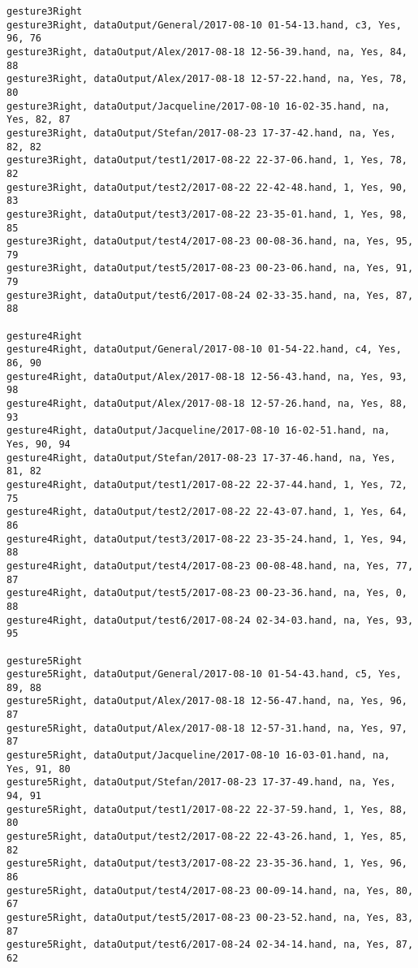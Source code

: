 \begin{verbatim}
gesture3Right
gesture3Right, dataOutput/General/2017-08-10 01-54-13.hand, c3, Yes, 96, 76
gesture3Right, dataOutput/Alex/2017-08-18 12-56-39.hand, na, Yes, 84, 88
gesture3Right, dataOutput/Alex/2017-08-18 12-57-22.hand, na, Yes, 78, 80
gesture3Right, dataOutput/Jacqueline/2017-08-10 16-02-35.hand, na, Yes, 82, 87
gesture3Right, dataOutput/Stefan/2017-08-23 17-37-42.hand, na, Yes, 82, 82
gesture3Right, dataOutput/test1/2017-08-22 22-37-06.hand, 1, Yes, 78, 82
gesture3Right, dataOutput/test2/2017-08-22 22-42-48.hand, 1, Yes, 90, 83
gesture3Right, dataOutput/test3/2017-08-22 23-35-01.hand, 1, Yes, 98, 85
gesture3Right, dataOutput/test4/2017-08-23 00-08-36.hand, na, Yes, 95, 79
gesture3Right, dataOutput/test5/2017-08-23 00-23-06.hand, na, Yes, 91, 79
gesture3Right, dataOutput/test6/2017-08-24 02-33-35.hand, na, Yes, 87, 88

gesture4Right
gesture4Right, dataOutput/General/2017-08-10 01-54-22.hand, c4, Yes, 86, 90
gesture4Right, dataOutput/Alex/2017-08-18 12-56-43.hand, na, Yes, 93, 98
gesture4Right, dataOutput/Alex/2017-08-18 12-57-26.hand, na, Yes, 88, 93
gesture4Right, dataOutput/Jacqueline/2017-08-10 16-02-51.hand, na, Yes, 90, 94
gesture4Right, dataOutput/Stefan/2017-08-23 17-37-46.hand, na, Yes, 81, 82
gesture4Right, dataOutput/test1/2017-08-22 22-37-44.hand, 1, Yes, 72, 75
gesture4Right, dataOutput/test2/2017-08-22 22-43-07.hand, 1, Yes, 64, 86
gesture4Right, dataOutput/test3/2017-08-22 23-35-24.hand, 1, Yes, 94, 88
gesture4Right, dataOutput/test4/2017-08-23 00-08-48.hand, na, Yes, 77, 87
gesture4Right, dataOutput/test5/2017-08-23 00-23-36.hand, na, Yes, 0, 88
gesture4Right, dataOutput/test6/2017-08-24 02-34-03.hand, na, Yes, 93, 95

gesture5Right
gesture5Right, dataOutput/General/2017-08-10 01-54-43.hand, c5, Yes, 89, 88
gesture5Right, dataOutput/Alex/2017-08-18 12-56-47.hand, na, Yes, 96, 87
gesture5Right, dataOutput/Alex/2017-08-18 12-57-31.hand, na, Yes, 97, 87
gesture5Right, dataOutput/Jacqueline/2017-08-10 16-03-01.hand, na, Yes, 91, 80
gesture5Right, dataOutput/Stefan/2017-08-23 17-37-49.hand, na, Yes, 94, 91
gesture5Right, dataOutput/test1/2017-08-22 22-37-59.hand, 1, Yes, 88, 80
gesture5Right, dataOutput/test2/2017-08-22 22-43-26.hand, 1, Yes, 85, 82
gesture5Right, dataOutput/test3/2017-08-22 23-35-36.hand, 1, Yes, 96, 86
gesture5Right, dataOutput/test4/2017-08-23 00-09-14.hand, na, Yes, 80, 67
gesture5Right, dataOutput/test5/2017-08-23 00-23-52.hand, na, Yes, 83, 87
gesture5Right, dataOutput/test6/2017-08-24 02-34-14.hand, na, Yes, 87, 62


\end{verbatim}
